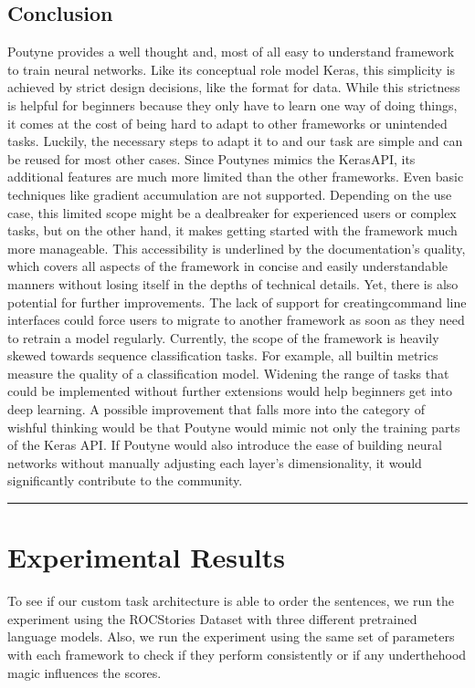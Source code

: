\documentclass[letterpaper,10pt,english]{jupyterBook}
\begin{document}
\section{Conclusion}
\label{\detokenize{Poutyne:conclusion}}
\sphinxAtStartPar
Poutyne provides a well thought and, most of all easy to understand framework to train neural networks.
Like its conceptual role model Keras, this simplicity is achieved by strict design decisions, like the  format for data.
While this strictness is helpful for beginners because they only have to learn one way of doing things, it comes at the cost of being hard to adapt to other frameworks or unintended tasks.
Luckily, the necessary steps to adapt it to  and our task are simple and can be reused for most other cases.
Since Poutynes mimics the Keras\sphinxhyphen{}API, its additional features are much more limited than the other frameworks. Even basic techniques like gradient accumulation are not supported.
Depending on the use case, this limited scope might be a deal\sphinxhyphen{}breaker for experienced users or complex tasks, but on the other hand, it makes getting started with the framework much more manageable.
This accessibility is underlined by the documentation’s quality, which covers all aspects of the framework in concise and easily understandable manners without losing itself in the depths of technical details.
Yet, there is also potential for further improvements.
The lack of support for creating\sphinxhyphen{}command line interfaces could force users to migrate to another framework as soon as they need to retrain a model regularly.
Currently, the scope of the framework is heavily skewed towards sequence classification tasks. For example, all built\sphinxhyphen{}in metrics measure the quality of a classification model.
Widening the range of tasks that could be implemented without further extensions would help beginners get into deep learning.
A possible improvement that falls more into the category of wishful thinking would be that Poutyne would mimic not only the training parts of the Keras API.
If Poutyne would also introduce the ease of building neural networks without manually adjusting each layer’s dimensionality, it would significantly contribute to the community.


\bigskip\hrule\bigskip



\chapter{Experimental Results}
\label{\detokenize{ExperimentalResults:experimental-results}}\label{\detokenize{ExperimentalResults::doc}}
\sphinxAtStartPar
To see if our custom task architecture is able to order the sentences, we run the experiment using the ROCStories Dataset with three different pretrained language models.
Also, we run the experiment using the same set of parameters with each framework to check if they perform consistently or if any under\sphinxhyphen{}the\sphinxhyphen{}hood magic influences the scores.
\end{document}
